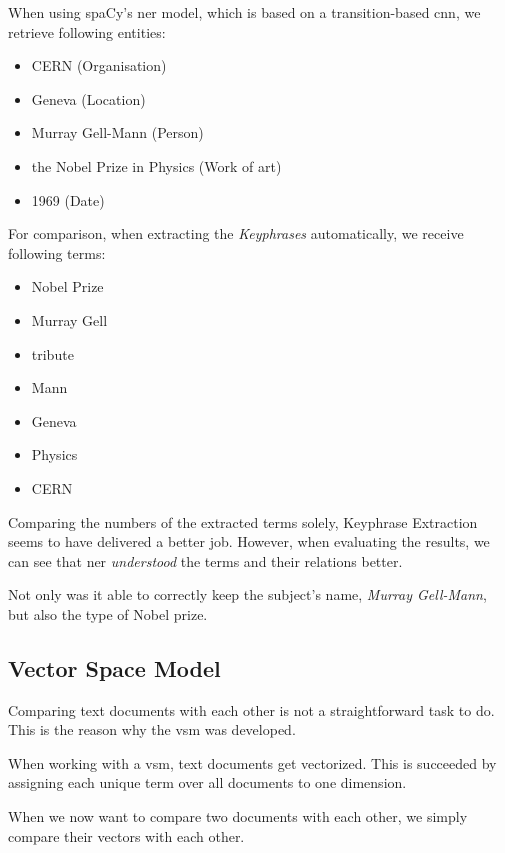 When using spaCy's \gls{ner} model, which is based on a transition-based \gls{cnn}\cite{LampleBSKD16},
we retrieve following entities:

\begin{itemize}
    \item CERN (Organisation)
    \item Geneva (Location)
    \item Murray Gell-Mann (Person)
    \item the Nobel Prize in Physics (Work of art)
    \item 1969 (Date)
\end{itemize}

For comparison, when extracting the \textit{Keyphrases} automatically, we receive following terms:

\begin{itemize}
    \item Nobel Prize
    \item Murray Gell
    \item tribute
    \item Mann
    \item Geneva
    \item Physics
    \item CERN
\end{itemize}

Comparing the numbers of the extracted terms solely, Keyphrase Extraction seems to have delivered a better job.
However, when evaluating the results, we can see that \Gls{ner} \textit{understood} the terms and their
relations better.

Not only was it able to correctly keep the subject's name, \textit{Murray Gell-Mann}, but also the type of Nobel prize.

\subsection{Vector Space Model}
\label{subsec:3_vector_space_model}

Comparing text documents with each other is not a straightforward task to do.
This is the reason why the \gls{vsm} was developed.

When working with a \gls{vsm}, text documents get vectorized.
This is succeeded by assigning each unique term over all documents to one dimension.

When we now want to compare two documents with each other,
we simply compare their vectors with each other.

